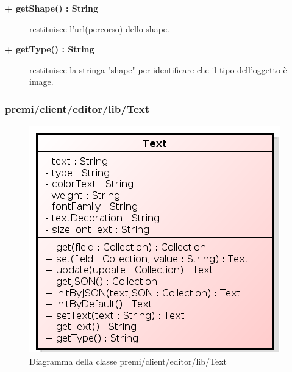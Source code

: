 \begin{description}
\begin{description}
\end{description}

\begin{description}
		\item[\textbf{\color{blue}+ getShape() : String			}] \hfill
			restituisce l'url(percorso) dello shape. 

\end{description}

\begin{description}
		\item[\textbf{\color{blue}+ getType() : String			}] \hfill
			restituisce la stringa "shape" per identificare che il tipo dell'oggetto è image. 

\end{description}



\end{description}


\subsubsection{premi/client/editor/lib/Text}
\begin{figure}[H]
\begin{center}
\includegraphics[scale=0.80]{img/diacla/text.png}
\caption{Diagramma della classe premi/client/editor/lib/Text}
\end{center}
\end{figure}

